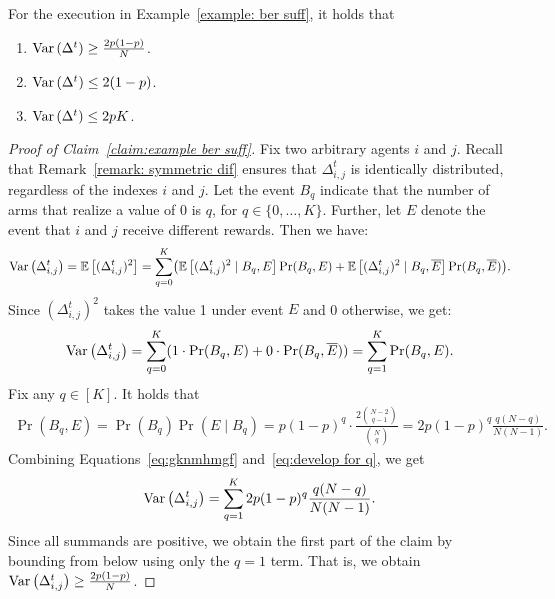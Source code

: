\begin{claim}\label{claim:example ber suff}
For the execution in Example~\ref{example: ber suff}, it holds that 
\begin{enumerate}
    \item $\mathrm{Var}\left( \Delta^t \right) \geq \frac{2p(1 - p)}{N}$.
    \item $\mathrm{Var}\left( \Delta^t \right) \leq  2(1-p)$.
    \item $\mathrm{Var}\left( \Delta^t \right) \leq  2pK$.
\end{enumerate}
\end{claim}
\begin{proof}[Proof of Claim~\ref{claim:example ber suff}]
Fix two arbitrary agents $i$ and $j$. Recall that Remark~\ref{remark: symmetric dif} ensures that $\Delta_{i,j}^t$ is identically distributed, regardless of the indexes $i$ and $j$. Let the event $B_q$ indicate that the number of arms that realize a value of 0 is $q$, for $q \in \{0, \ldots, K\}$. Further, let $E$ denote the event that $i$ and $j$ receive different rewards. Then we have:
\[
\mathrm{Var}\left( \Delta_{i,j}^t \right) = \mathbb{E}\left[ (\Delta_{i,j}^t)^2 \right] 
= \sum_{q=0}^K \bigl( \mathbb{E}\left[ (\Delta_{i,j}^t)^2 \mid B_q, E \right]\Pr(B_q, E) 
+ \mathbb{E}\left[ (\Delta_{i,j}^t)^2 \mid B_q, \overline{E} \right]\Pr(B_q, \overline{E}) \bigr).
\]
Since $(\Delta_{i,j}^t)^2$ takes the value 1 under event $E$ and 0 otherwise, we get:
\begin{equation}\label{eq:gknmhmgf}
\mathrm{Var}\left( \Delta_{i,j}^t \right) = \sum_{q=0}^K (1 \cdot \Pr(B_q, E) + 0 \cdot \Pr(B_q, \overline{E})) 
= \sum_{q=1}^K \Pr(B_q, E).    
\end{equation}
Fix any $q\in[K]$. It holds that 
\begin{align}\label{eq:develop for q}
\Pr(B_q, E) = \Pr(B_q)\Pr(E \mid B_q) =  p (1 - p)^{q}\cdot \frac{2\binom{N-2}{q-1}}{\binom{N}{q}} =  2 p (1 - p)^{q}\frac{q(N-q)}{N(N-1)}.
\end{align}
Combining Equations~\eqref{eq:gknmhmgf} and~\eqref{eq:develop for q}, we get
\begin{align}\label{eq:var def}
\mathrm{Var}\left( \Delta_{i,j}^t \right) = \sum_{q=1}^K 2 p (1 - p)^{q}\frac{q(N-q)}{N(N-1)}.
\end{align}
Since all summands are positive, we obtain the first part of the claim by bounding from below using only the $q=1$ term. That is, we obtain $\mathrm{Var}\left( \Delta_{i,j}^t \right) \geq  \frac{2p(1 - p)}{N}$. 


\end{proof}

